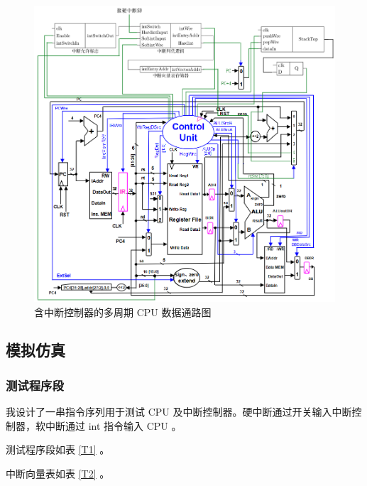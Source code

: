 \documentclass{article}
\begin{document}
\begin{figure}
\centering
\includegraphics[scale=0.65]{../pics/DataPath.png}
\caption{含中断控制器的多周期 CPU 数据通路图}
\label{M7}
\end{figure}

\subsection{模拟仿真}

\subsubsection{测试程序段}

我设计了一串指令序列用于测试 CPU 及中断控制器。硬中断通过开关输入中断控制器，软中断通过 int 指令输入 CPU 。

测试程序段如表 \ref{T1} 。

中断向量表如表 \ref{T2} 。
\end{document}

